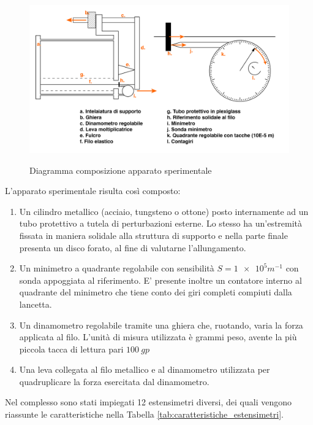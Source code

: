\documentclass[a4paper,11pt,oneside]{article}
\begin{document}
\begin{figure}[h!]
    \centering
    \caption{Diagramma composizione apparato sperimentale}
    \includegraphics[width=12.5cm]{ApparatoSperimentale.jpg}
    \label{fig:apparato_sperimentale}
\end{figure}
L'apparato sperimentale risulta così composto:
\begin{enumerate}
    \item Un cilindro metallico (acciaio, tungsteno o ottone) posto internamente ad un tubo protettivo a tutela di perturbazioni esterne. Lo stesso ha un'estremità fissata in maniera solidale alla struttura di supporto e nella parte finale presenta un disco forato, al fine di valutarne l'allungamento.
    \item Un minimetro a quadrante regolabile con sensibilità $S=\num{1e5} \si{m^{-1}}$ con sonda appoggiata al riferimento. E' presente inoltre un contatore interno al quadrante del minimetro che tiene conto dei giri completi compiuti dalla lancetta.
    \item Un dinamometro regolabile tramite una ghiera che, ruotando, varia la forza applicata al filo. L'unità di misura utilizzata è grammi peso, avente la più piccola tacca di lettura pari $\SI{100}{gp}$
    \item Una leva collegata al filo metallico e al dinamometro utilizzata per quadruplicare la forza esercitata dal dinamometro.
\end{enumerate}
Nel complesso sono stati impiegati 12 estensimetri diversi, dei quali vengono riassunte le caratteristiche nella Tabella \ref{tab:caratteristiche_estensimetri}.
\end{document}
